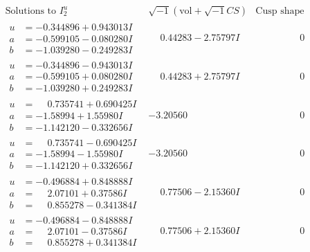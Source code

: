 \documentclass[1p]{elsarticle_modified}
\theoremstyle{definition}
\newcommand{\I}{\sqrt{-1}}
\begin{document}
$$\begin{array}{c|c|c}  
\text{Solutions to }I^u_{2}& \I (\text{vol} + \sqrt{-1}CS) & \text{Cusp shape}\\
 \hline 
\begin{aligned}
u &= -0.344896 + 0.943013 I \\
a &= -0.599105 - 0.080280 I \\
b &= -1.039280 - 0.249283 I\end{aligned}
 & \phantom{-}0.44283 - 2.75797 I & \phantom{-0.000000 } 0 \\ \hline\begin{aligned}
u &= -0.344896 - 0.943013 I \\
a &= -0.599105 + 0.080280 I \\
b &= -1.039280 + 0.249283 I\end{aligned}
 & \phantom{-}0.44283 + 2.75797 I & \phantom{-0.000000 } 0 \\ \hline\begin{aligned}
u &= \phantom{-}0.735741 + 0.690425 I \\
a &= -1.58994 + 1.55980 I \\
b &= -1.142120 - 0.332656 I\end{aligned}
 & -3.20560\phantom{ +0.000000I} & \phantom{-0.000000 } 0 \\ \hline\begin{aligned}
u &= \phantom{-}0.735741 - 0.690425 I \\
a &= -1.58994 - 1.55980 I \\
b &= -1.142120 + 0.332656 I\end{aligned}
 & -3.20560\phantom{ +0.000000I} & \phantom{-0.000000 } 0 \\ \hline\begin{aligned}
u &= -0.496884 + 0.848888 I \\
a &= \phantom{-}2.07101 + 0.37586 I \\
b &= \phantom{-}0.855278 - 0.341384 I\end{aligned}
 & \phantom{-}0.77506 - 2.15360 I & \phantom{-0.000000 } 0 \\ \hline\begin{aligned}
u &= -0.496884 - 0.848888 I \\
a &= \phantom{-}2.07101 - 0.37586 I \\
b &= \phantom{-}0.855278 + 0.341384 I\end{aligned}
 & \phantom{-}0.77506 + 2.15360 I & \phantom{-0.000000 } 0 \\ \hline\begin{aligned}

\end{aligned}
\end{array}$$
\end{document}
